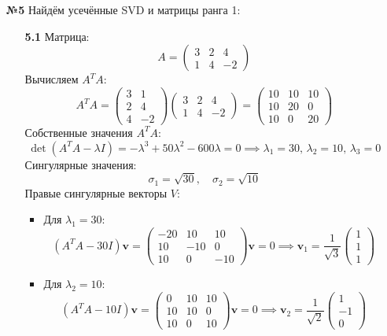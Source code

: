 \documentclass[a4paper]{article}
\begin{document}
\begin{enumerate}
  \item[\textbf{№5}]Найдём усечённые SVD и матрицы ранга 1:
  \begin{enumerate}
  
  \item[\textbf{5.1}]Матрица:  
  \[
  A = \begin{pmatrix}
  3 & 2 & 4 \\
  1 & 4 & -2
  \end{pmatrix}
  \]
  Вычисляем \( A^T A \):  
  \[
  A^T A = \begin{pmatrix}
  3 & 1 \\
  2 & 4 \\
  4 & -2
  \end{pmatrix} \begin{pmatrix}
  3 & 2 & 4 \\
  1 & 4 & -2
  \end{pmatrix} = \begin{pmatrix}
  10 & 10 & 10 \\
  10 & 20 & 0 \\
  10 & 0 & 20
  \end{pmatrix}
  \]
  Собственные значения \( A^T A \):  
  \[
  \det(A^T A - \lambda I) = -\lambda^3 + 50\lambda^2 -
   600\lambda = 0 \implies \lambda_1 = 30, \, \lambda_2 = 10, \, \lambda_3 = 0
  \]  
  Сингулярные значения:  
  \[
  \sigma_1 = \sqrt{30}, \quad \sigma_2 = \sqrt{10}
  \]
  Правые сингулярные векторы \( V \):  
  \begin{itemize}
    \item 
    Для \( \lambda_1 = 30 \):  
    \[
    (A^T A - 30I)\mathbf{v} = \begin{pmatrix}
    -20 & 10 & 10 \\
    10 & -10 & 0 \\
    10 & 0 & -10
    \end{pmatrix}\mathbf{v} = 0 \implies \mathbf{v}_1 = 
    \frac{1}{\sqrt{3}} \begin{pmatrix} 1 \\ 1 \\ 1 \end{pmatrix}
    \]  
    \item
    Для \( \lambda_2 = 10 \):  
    \[
    (A^T A - 10I)\mathbf{v} = \begin{pmatrix}
    0 & 10 & 10 \\
    10 & 10 & 0 \\
    10 & 0 & 10
    \end{pmatrix}\mathbf{v} = 0 \implies \mathbf{v}_2 = 
    \frac{1}{\sqrt{2}} \begin{pmatrix} 1 \\ -1 \\ 0 \end{pmatrix}
\]
\end{itemize}
\end{enumerate}
\end{enumerate}
\end{document}
